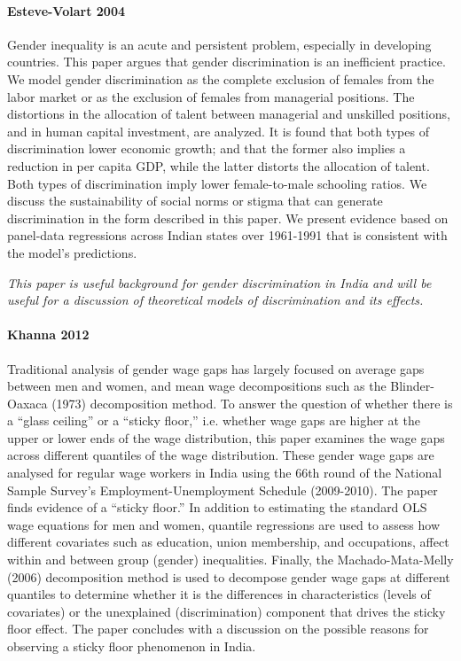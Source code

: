 \documentclass[a4paper]{article}
\begin{document}
\paragraph{Esteve-Volart 2004} Gender inequality is an acute and persistent problem, especially in developing countries. This paper argues that gender discrimination is an inefficient practice. We model gender discrimination as the complete exclusion of females from the labor market or as the exclusion of females from managerial positions. The distortions in the allocation of talent between managerial and unskilled positions, and in human capital investment, are analyzed. It is found that both types of discrimination lower economic growth; and that the former also implies a reduction in per capita GDP, while the latter distorts the allocation of talent. Both types of discrimination imply lower female-to-male schooling ratios. We discuss the sustainability of social norms or stigma that can generate discrimination in the form described in this paper. We present evidence based on panel-data regressions across Indian states over 1961-1991 that is consistent with the model’s predictions.

\textit{This paper is useful background for gender discrimination in India and will be useful for a discussion of theoretical models of discrimination and its effects.}

\paragraph{Khanna 2012} Traditional analysis of gender wage gaps has largely focused on average gaps between men and women, and mean wage decompositions such as the Blinder-Oaxaca (1973) decomposition method. To answer the question of whether there is a “glass ceiling” or a “sticky floor,” i.e. whether wage gaps are higher at the upper or lower ends of the wage distribution, this paper examines the wage gaps across different quantiles of the wage distribution. These gender wage gaps are analysed for regular wage workers in India using the 66th round of the National Sample Survey’s Employment-Unemployment Schedule (2009-2010). The paper finds evidence of a “sticky floor.” In addition to estimating the standard OLS wage equations for men and women, quantile regressions are used to assess how different covariates such as education, union membership, and occupations, affect within and between group (gender) inequalities. Finally, the Machado-Mata-Melly (2006) decomposition method is used to decompose gender wage gaps at different quantiles to determine whether it is the differences in characteristics (levels of covariates) or the unexplained (discrimination) component that drives the sticky floor effect. The paper concludes with a discussion on the possible reasons for observing a sticky floor phenomenon in India. 
\end{document}
